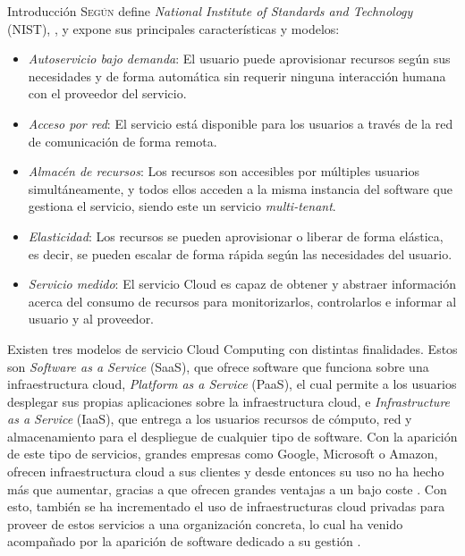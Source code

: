 \begin{chapter}{Introducción}
\label{chap:introducion}
\lettrine{S}{egún} define \textit{National Institute of Standards and Technology} (NIST), \cite{computing}, y expone sus principales características y modelos\label{nist}:
\begin{itemize}
    \item \emph{Autoservicio bajo demanda}: El usuario puede aprovisionar recursos según sus necesidades y de forma automática sin requerir ninguna interacción humana con el proveedor del servicio.
    \item \emph{Acceso por red}: El servicio está disponible para los usuarios a través de la red de comunicación de forma remota.
    \item \emph{Almacén de recursos}: Los recursos son accesibles por múltiples usuarios simultáneamente, y todos ellos acceden a la misma instancia del software que gestiona el servicio, siendo este un servicio \textit{multi-tenant}.
    \item \emph{Elasticidad}: Los recursos se pueden aprovisionar o liberar de forma elástica, es decir, se pueden escalar de forma rápida según las necesidades del usuario.
    \item \emph{Servicio medido}: El servicio Cloud es capaz de obtener y abstraer información acerca del consumo de recursos para monitorizarlos, controlarlos e informar al usuario y al proveedor.
\end{itemize}
Existen tres modelos de servicio Cloud Computing con distintas finalidades. Estos son \textit{Software as a Service} (SaaS), que ofrece software que funciona sobre una infraestructura cloud, \textit{Platform as a Service} (PaaS), el cual permite a los usuarios desplegar sus propias aplicaciones sobre la infraestructura cloud, e \textit{Infrastructure as a Service} (IaaS), que entrega a los usuarios recursos de cómputo, red y almacenamiento para el despliegue de cualquier tipo de software. 
Con la aparición de este tipo de servicios, grandes empresas como Google, Microsoft o Amazon, ofrecen infraestructura cloud a sus clientes y desde entonces su uso no ha hecho más que aumentar, gracias a que ofrecen grandes ventajas a un bajo coste \cite{cloud-computing-growth}. Con esto, también se ha incrementado el uso de infraestructuras cloud privadas para proveer de estos servicios a una organización concreta, lo cual ha venido acompañado por la aparición de software dedicado a su gestión \cite{cloud-platforms}.


\end{chapter}
